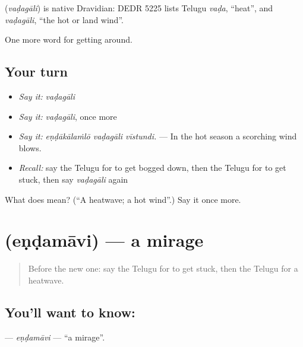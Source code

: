 \begin{cousinweb}
\textbf{} (\emph{vaḍagāli}) is native Dravidian: DEDR 5225 lists Telugu \emph{vaḍa}, \textquotedblleft{}heat\textquotedblright{}, and \emph{vaḍagāli}, \textquotedblleft{}the hot or land wind\textquotedblright{}.
\end{cousinweb}

\begin{grammarlens}[title={What you've built}]
One more word for getting around.
\end{grammarlens}

\subsection*{Your turn}
\begin{itemize}
\raggedright
  \item \emph{Say it:} \emph{vaḍagāli}
  \item \emph{Say it:} \emph{vaḍagāli}, once more
  \item \emph{Say it:} \emph{eṇḍākālaṁlō vaḍagāli vīstundi.} — In the hot season a scorching wind blows.
  \item \emph{Recall:} say the Telugu for to get bogged down, then the Telugu for to get stuck, then say \emph{vaḍagāli} again
\end{itemize}

\begin{tcolorbox}[breakable,colback=teal!4,colframe=teal!35!black,title={Before you move on}]
What does  mean? (\textquotedblleft{}A heatwave; a hot wind\textquotedblright{}.) Say it once more.
\end{tcolorbox}
\section[\texorpdfstring{\te{ఎండమావి} (eṇḍamāvi)}{ఎండమావి (eṇḍamāvi)}]{ (eṇḍamāvi) — a mirage}

\label{lesson:TE-C481-endamavi}



\begin{quote}
Before the new one: say the Telugu for to get stuck, then the Telugu for a heatwave.
\end{quote}

\subsection*{You'll want to know: }
\textbf{} — \emph{eṇḍamāvi} — \textquotedblleft{}a mirage\textquotedblright{}.

